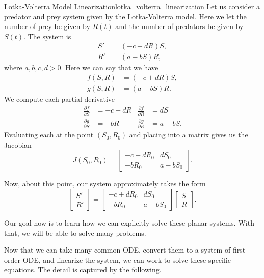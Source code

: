         \begin{ex}{Lotka-Volterra Model Linearization}{lotka_volterra_linearization}
        Let us consider a predator and prey system given by the Lotka-Volterra model.  Here we let the number of prey be given by $R(t)$ and the number of predators be given by $S(t)$.  The system is
        \begin{align*}
            S' &= (-c+dR)S,\\
            R' &= (a-bS)R,
        \end{align*}
        where $a,b,c,d>0$. Here we can say that we have
        \begin{align*}
        f(S,R) &= (-c+dR)S,\\
        g(S,R) &= (a-bS)R.
        \end{align*}
        We compute each partial derivative
        \begin{align*}
            \frac{\partial f}{\partial S} &= -c+dR & \frac{\partial f}{\partial R} &=dS \\
            \frac{\partial g}{\partial S} &= -bR & \frac{\partial g}{\partial R} &= a-bS.
        \end{align*}
        Evaluating each at the point $(S_0,R_0)$ and placing into a matrix gives us the Jacobian
        \[
        J(S_0,R_0)=\begin{bmatrix} -c+dR_0 & dS_0 \\ -bR_0 & a-bS_0 \end{bmatrix}.
        \]
        
        Now, about this point, our system approximately takes the form
        \[
        \begin{bmatrix} S' \\ R' \end{bmatrix} = \begin{bmatrix} -c+dR_0 & dS_0 \\ -bR_0 & a-bS_0 \end{bmatrix} \begin{bmatrix} S \\ R \end{bmatrix}.
        \]
        \end{ex}
        
        Our goal now is to learn how we can explicitly solve these planar systems.  With that, we will be able to solve many problems.
        
        
        Now that we can take many common ODE, convert them to a system of first order ODE, and linearize the system, we can work to solve these specific equations.  The detail is captured by the following.
        
